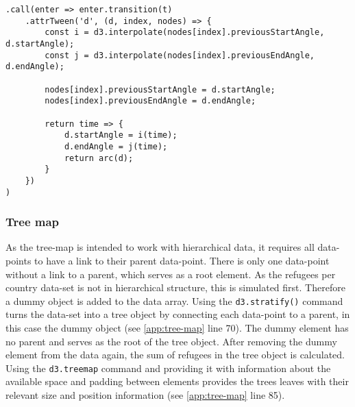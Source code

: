\begin{minipage}{0.9\linewidth}
    \begin{lstlisting}[style=htmlcssjs, captionpos=b, caption={The implementation of the arc update animations. There are two interpolate functions defined in the beginning. They are called \texttt{i} and \texttt{j}. Next the new values for start and end angle are stored on the node itself. This needs to be done to be able to reference these values again for the next update, as the previous angles will not be accessible through the pie object after regenerating it for an update. Finally the function which is called for each frame of the animation is defined and returned. This function first interpolates the start and end angle values using the previously defined functions and the time of time which has already pased in the animation. This time value is in the range of zero to one, depending on how far along the animation is. These newly interpolated angles define the start and end angle of the pie piece, which is then turned into a path element by calling the \texttt{arc} function for this pie piece. (Section from \ref{app:donut-chart} lines 136ff)}, label={lst:donut-chart}]
.call(enter => enter.transition(t)
    .attrTween('d', (d, index, nodes) => {
        const i = d3.interpolate(nodes[index].previousStartAngle, d.startAngle);
        const j = d3.interpolate(nodes[index].previousEndAngle, d.endAngle);

        nodes[index].previousStartAngle = d.startAngle;
        nodes[index].previousEndAngle = d.endAngle;

        return time => {
            d.startAngle = i(time);
            d.endAngle = j(time);
            return arc(d);
        }
    })
)
    \end{lstlisting}
\end{minipage}


\subsubsection{Tree map}
As the tree-map is intended to work with hierarchical data, it requires all data-points to have a link to their parent data-point. There is only one data-point without a link to a parent, which serves as a root element. As the refugees per country data-set is not in hierarchical structure, this is simulated first. Therefore a dummy object is added to the data array. Using the \texttt{d3.stratify()} command turns the data-set into a tree object by connecting each data-point to a parent, in this case the dummy object (see \ref{app:tree-map} line 70). The dummy element has no parent and serves as the root of the tree object. After removing the dummy element from the data again, the sum of refugees in the tree object is calculated. Using the \texttt{d3.treemap} command and providing it with information about the available space and padding between elements provides the trees leaves with their relevant size and position information (see \ref{app:tree-map} line 85).

